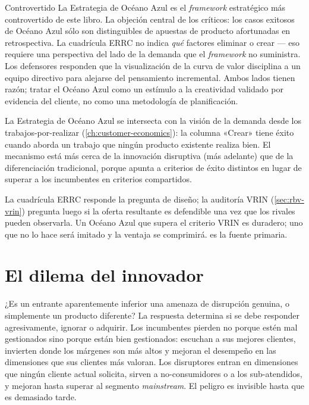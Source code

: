 \begin{admonition}{Controvertido}
La Estrategia de Océano Azul es el \emph{framework} estratégico más controvertido de este
libro. La objeción central de los críticos: los casos exitosos de Océano Azul sólo son
distinguibles de apuestas de producto afortunadas en retrospectiva. La cuadrícula ERRC no
indica \emph{qué} factores eliminar o crear --- eso requiere una perspectiva del lado de la
demanda que el \emph{framework} no suministra. Los defensores responden que la visualización
de la curva de valor disciplina a un equipo directivo para alejarse del pensamiento
incremental. Ambos lados tienen razón; tratar el Océano Azul como un estímulo a la
creatividad validado por evidencia del cliente, no como una metodología de planificación.
\end{admonition}

La Estrategia de Océano Azul se intersecta con la visión de la demanda desde los
trabajos-por-realizar (\cref{ch:customer-economics}): la columna «Crear» tiene éxito cuando
aborda un trabajo que ningún producto existente realiza bien. El mecanismo está más cerca de
la innovación disruptiva (más adelante) que de la diferenciación tradicional, porque apunta a
criterios de éxito distintos en lugar de superar a los incumbentes en criterios compartidos.

La cuadrícula ERRC responde la pregunta de diseño; la auditoría VRIN (\cref{sec:rbv-vrin})
pregunta luego si la oferta resultante es defendible una vez que los rivales pueden observarla.
Un Océano Azul que supera el criterio VRIN es duradero; uno que no lo hace será imitado y la
ventaja se comprimirá. \textcite{kim2015} es la fuente primaria.

\section{El dilema del innovador}\label{sec:innovators-dilemma}

¿Es un entrante aparentemente inferior una amenaza de disrupción genuina, o simplemente un
producto diferente? La respuesta determina si se debe responder agresivamente, ignorar o
adquirir. Los incumbentes pierden no porque estén mal gestionados sino porque están bien
gestionados: escuchan a sus mejores clientes, invierten donde los márgenes son más altos y
mejoran el desempeño en las dimensiones que sus clientes más valoran. Los disruptores entran
en dimensiones que ningún cliente actual solicita, sirven a no-consumidores o a los
sub-atendidos, y mejoran hasta superar al segmento \emph{mainstream}. El peligro es invisible
hasta que es demasiado tarde.

